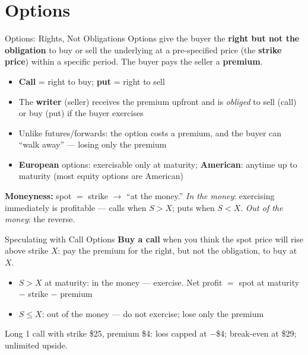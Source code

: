 \documentclass[aspectratio=169]{beamer}
\begin{document}
\section{Options}

\begin{frame}{Options: Rights, Not Obligations}
Options give the buyer the \textbf{right but not the obligation} to buy or sell the underlying at a pre-specified price (the \textbf{strike price}) within a specific period. The buyer pays the seller a \textbf{premium}.
\begin{itemize}
  \item \textbf{Call} = right to buy; \textbf{put} = right to sell
  \item The \textbf{writer} (seller) receives the premium upfront and is \emph{obliged} to sell (call) or buy (put) if the buyer exercises
  \item Unlike futures/forwards: the option costs a premium, and the buyer can ``walk away'' --- losing only the premium
  \item \textbf{European} options: exercisable only at maturity; \textbf{American}: anytime up to maturity (most equity options are American)
\end{itemize}
\vspace{0.2em}
\textbf{Moneyness:} spot $=$ strike $\to$ ``at the money.'' \emph{In the money}: exercising immediately is profitable --- calls when $S > X$; puts when $S < X$. \emph{Out of the money}: the reverse.
\end{frame}

\begin{frame}{Speculating with Call Options}
\textbf{Buy a call} when you think the spot price will rise above strike $X$: pay the premium for the right, but not the obligation, to buy at $X$.
\begin{itemize}
  \item $S > X$ at maturity: in the money --- exercise. Net profit $=$ spot at maturity $-$ strike $-$ premium
  \item $S \le X$: out of the money --- do not exercise; lose only the premium
\end{itemize}
\begin{center}
\end{center}
Long 1 call with strike \$25, premium \$4: loss capped at $-$\$4; break-even at \$29; unlimited upside.
\end{frame}
\end{document}
